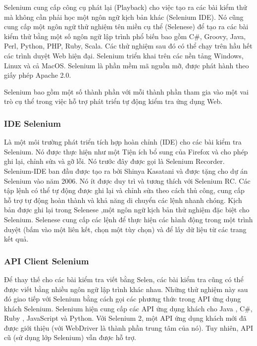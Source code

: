 	Selenium cung cấp công cụ phát lại (Playback) cho việc tạo ra các bài kiểm thử mà không cần phải học một ngôn ngữ kịch bản khác (Selenium IDE). Nó cũng cung cấp một ngôn ngữ thử nghiệm tên miền cụ thể (Selenese) để tạo ra các bài kiểm thử bằng một số ngôn ngữ lập trình phổ biến bao gồm C\#, Groovy, Java, Perl, Python, PHP, Ruby, Scala. Các thử nghiệm sau đó có thể chạy trên hầu hết các trình duyệt Web hiện đại. Selenium triển khai trên các nền tảng Windows, Linux và cả MacOS. Selenium là phần mềm mã nguồn mỡ, được phát hành theo giấy phép Apache 2.0.
	
	Selenium bao gồm một số thành phần với mỗi thành phần tham gia vào một vai trò cụ thể trong việc hỗ trợ phát triển tự động kiểm tra ứng dụng Web.
		\subsubsection{IDE Selenium}
		Là một môi trường phát triển tích hợp hoàn chỉnh (IDE) cho các bài kiểm tra Selenium. Nó được thực hiện như một Tiện ích bổ sung của Firefox và cho phép ghi lại, chỉnh sửa và gỡ lỗi. Nó trước đây được gọi là Selenium Recorder. Selenium-IDE ban đầu được tạo ra bởi Shinya Kasatani và được tặng cho dự án Selenium vào năm 2006. Nó ít được duy trì và tương thích với Selenium RC. Các tập lệnh có thể tự động được ghi lại và chỉnh sửa theo cách thủ công, cung cấp hỗ trợ tự động hoàn thành và khả năng di chuyển các lệnh nhanh chóng. Kịch bản được ghi lại trong Selenese ,một ngôn ngữ kịch bản thử nghiệm đặc biệt cho Selenium. Selenese cung cấp các lệnh để thực hiện các hành động trong một trình duyệt (bấm vào một liên kết, chọn một tùy chọn) và để lấy dữ liệu từ các trang kết quả.
		\subsubsection{API Client Selenium}
		Để thay thế cho các bài kiểm tra viết bằng Selen, các bài kiểm tra cũng có thể được viết bằng nhiều ngôn ngữ lập trình khác nhau. Những thử nghiệm này sau đó giao tiếp với Selenium bằng cách gọi các phương thức trong API ứng dụng khách Selenium. Selenium hiện cung cấp các API ứng dụng khách cho Java , C\#, Ruby , JavaScript và Python. Với Selenium 2, một API ứng dụng khách mới đã được giới thiệu (với WebDriver là thành phần trung tâm của nó). Tuy nhiên, API cũ (sử dụng lớp Selenium) vẫn được hỗ trợ.
